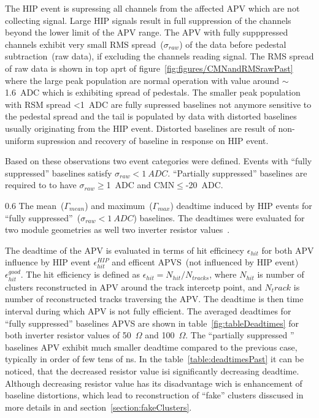 The HIP event is supressing all channels from the affected APV which are not collecting signal. Large HIP signals result in full suppression of the channels beyond the lower limit of the APV range. The APV with fully supppressed channels exhibit very small RMS spread~($\sigma_{raw}$) of the data before pedestal subtraction~(raw data), if excluding the channels reading signal. The RMS spread of raw data is shown in top aprt of figure~\ref{fig:figures/CMNandRMSrawPast} where the large peak population are normal operation with value around $\sim$1.6~ADC which is exhibiting spread of pedestals. The smaller peak population with RSM spread <1~ADC are fully supressed baselines not anymore sensitive to the pedestal spread and the tail is populated by data with distorted baselines usually originating from the HIP event. Distorted baselines are result of non-uniform supression and recovery of baseline in response on HIP event.

Based on these observations two event categories were defined. Events with ``fully suppressed'' baselines  satisfy $\sigma_{raw}< 1~ADC$. ``Partially suppressed'' baselines are required to to have $\sigma_{raw}\geq$1~ADC and CMN$\leq$-20~ADC.



                 {0.6}       %
                 {The mean~($\Gamma_{mean}$) and maximum~($\Gamma_{max}$) deadtime induced by HIP events for ``fully suppressed''~($\sigma_{raw}<1~ADC$) baselines. The deadtimes were evaluated for two module geometries as well two inverter resistor values~\cite{Bainbridge:2004jc}.} %

The deadtime of the APV is evaluated in terms of hit efficinecy $\epsilon_{hit}$ for both APV influence by HIP event $\epsilon_{hit}^{HIP}$ and efficent APVS~(not influenced by HIP event) $\epsilon_{hit}^{good}$. The hit efficiency is defined as $\epsilon_{hit} = N_{hit}/N_{tracks}$, where $N_{hit}$ is number of clusters reconstructed in APV around the track intercetp point, and $N_track$ is number of reconstructed tracks traversing the APV. The deadtime is then time interval during which APV is not fully efficient. The averaged deadtimes for ``fully suppressed'' baselines APVS are shown in table~\ref{fig:tableDeadtimes} for both inverter resistor values of 50~$\Omega$ and 100~$\Omega$. The ``partially suppressed '' baselines APV exhibit much smaller deadtime compared to the previous case, typically in order of few tens of ns. In the table~\ref{table:deadtimesPast} it can be noticed, that the decreased resistor value isi significantly decreasing deadtime. Although decreasing resistor value has its disadvantage wich is enhancement of baseline distortions, which lead to reconstruction of ``fake'' clusters disscused in more details in \cite{Bainbridge:2004jc} and section~\ref{section:fakeClusters}.


